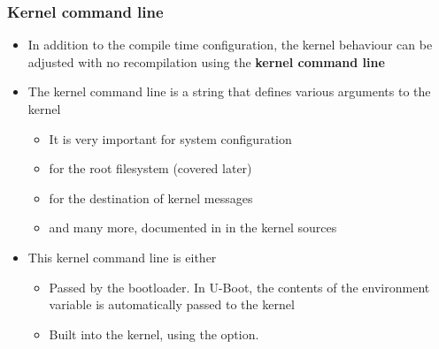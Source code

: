 \begin{frame}
  \frametitle{Kernel command line}
  \begin{itemize}
  \item In addition to the compile time configuration, the kernel
    behaviour can be adjusted with no recompilation using the {\bf
      kernel command line}
  \item The kernel command line is a string that defines various
    arguments to the kernel
    \begin{itemize}
    \item It is very important for system configuration
    \item {} for the root filesystem (covered later)
    \item {} for the destination of kernel messages
    \item and many more, documented in
       in the kernel sources
    \end{itemize}
  \item This kernel command line is either
    \begin{itemize}
    \item Passed by the bootloader. In U-Boot, the contents of the
       environment variable is automatically passed to the
      kernel
    \item Built into the kernel, using the  option.
    \end{itemize}
  \end{itemize}
\end{frame}

